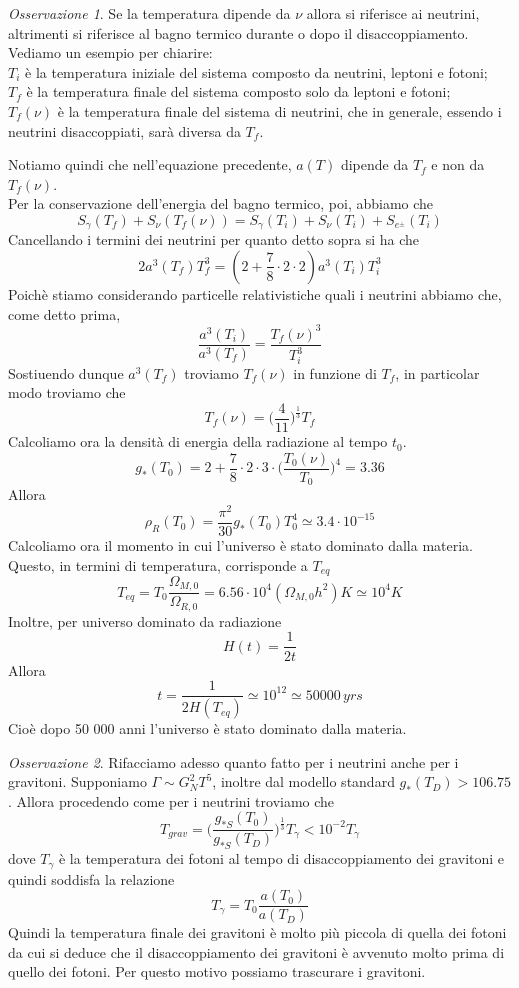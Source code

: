\documentclass[10pt,a4paper]{article}
\theoremstyle{break}
\theoremstyle{remark}
\newtheorem{oss}{Osservazione}
\theoremstyle{definition}
\begin{document}
\begin{oss}
	Se la temperatura dipende da $\nu$ allora si riferisce ai neutrini, altrimenti si riferisce al bagno termico durante o dopo il disaccoppiamento. Vediamo un esempio per chiarire:\\
	$T_i$ è la temperatura iniziale del sistema composto da neutrini, leptoni e fotoni;\\
	$T_f$ è la temperatura finale del sistema composto solo da leptoni e fotoni;\\
	$T_f(\nu)$ è la temperatura finale del sistema di neutrini, che in generale, essendo i neutrini disaccoppiati, sarà diversa da $T_f$.
\end{oss}
Notiamo quindi che nell'equazione precedente, $a(T)$ dipende da $T_f$ e non da $T_f(\nu)$.\\
Per la conservazione dell'energia del bagno termico, poi, abbiamo che 
\[
S_\gamma(T_f) + S_\nu(T_f(\nu)) = S_\gamma(T_i) + S_\nu(T_i) + S_{e^\pm} (T_i)
\]
Cancellando i termini dei neutrini per quanto detto sopra si ha che
\[
2 a^3(T_f)T_f^3 = (2 + \frac78 \cdot 2 \cdot 2)a^3(T_i) T_i^3
\]
Poichè stiamo considerando particelle relativistiche quali i neutrini abbiamo che, come detto prima, 
\[
\frac{a^3(T_i)}{a^3(T_f)} = \frac{T_f(\nu)^3}{T_i^3}
\]
Sostiuendo dunque $a^3(T_f)$ troviamo $T_f(\nu)$ in funzione di $T_f$, in particolar modo troviamo che
\[
T_f(\nu) = \bigg(\frac{4}{11}\bigg)^{\frac13} T_f
\]
Calcoliamo ora la densità di energia della radiazione al tempo $t_0$.
\[
g_*(T_0) = 2+ \frac78 \cdot 2 \cdot 3 \cdot \bigg(\frac{T_0(\nu)}{T_0}\bigg)^4 = 3.36
\]
Allora
\[
\rho_R(T_0) = \frac{\pi^2}{30}g_*(T_0)T_0^4 \simeq 3.4 \cdot 10^{-15}
\]
Calcoliamo ora il momento in cui l'universo è stato dominato dalla materia.
Questo, in termini di temperatura, corrisponde a $T_{eq}$
\[
T_{eq} = T_0 \frac{\Omega_{M, 0}}{\Omega_{R, 0}} = 6.56 \cdot 10^4 (\Omega_{M, 0} h^2) K \simeq 10^4 K 
\]
Inoltre, per universo dominato da radiazione
\[
H(t) = \frac{1}{2 t}
\]
Allora
\[
t = \frac{1}{2 H(T_{eq})} \simeq 10^{12} \simeq 50000\,yrs
\]
Cioè dopo 50 000 anni l'universo è stato dominato dalla materia.
\begin{oss}
	Rifacciamo adesso quanto fatto per i neutrini anche per i gravitoni. Supponiamo $\Gamma \sim G_N^2 T^5$, inoltre dal modello standard $g_*(T_D) > 106.75$. Allora procedendo come per i neutrini troviamo che
	\[
	T_{grav} = \bigg(\frac{g_{*S}(T_0)}{g_{*S}(T_D)}\bigg)^\frac13 T_\gamma < 10^{-2} T_\gamma
	\]
	dove $T_\gamma$ è la temperatura dei fotoni al tempo di disaccoppiamento dei gravitoni e quindi soddisfa la relazione
	\[
	T_\gamma = T_0 \frac{a(T_0)}{a(T_D)}
	\]
	Quindi la temperatura finale dei gravitoni è molto più piccola di quella dei fotoni da cui si deduce che il disaccoppiamento dei gravitoni è avvenuto molto prima di quello dei fotoni. Per questo motivo possiamo trascurare i gravitoni.
\end{oss}
\end{document}
